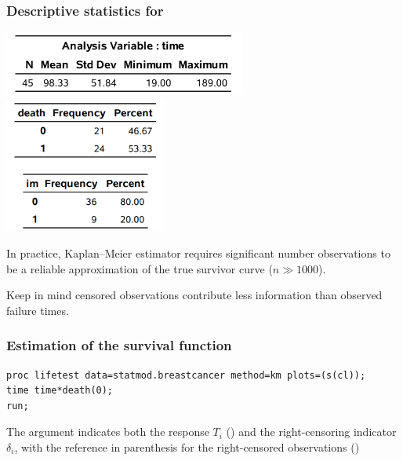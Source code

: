 \documentclass{beamer}
\begin{document}
\begin{frame}
\frametitle{Descriptive statistics for }
\begin{center}
\includegraphics[width = 0.6\textwidth]{img/c7/slides7e01}
\includegraphics[width = 0.4\textwidth]{img/c7/slides7e02}
\end{center}
{
\footnotesize In practice, Kaplan--Meier estimator requires significant number observations to be a reliable approximation of the true survivor curve ($n \gg 1000$).

Keep in mind censored observations contribute less information than observed failure times.

}
\end{frame}


\begin{frame}[fragile]
\frametitle{Estimation of the survival function }

\begin{tcolorbox}[colback=white,colframe=hecblue,title= \SASlang{} code to fit the Kaplan--Meier estimator]
{\footnotesize 
\begin{verbatim}
proc lifetest data=statmod.breastcancer method=km plots=(s(cl));
time time*death(0);
run;
\end{verbatim}
}
\end{tcolorbox}
{ \footnotesize 
The  argument indicates both the response $T_i$ () and the right-censoring indicator $\delta_i$, with the reference in parenthesis for the right-censored observations ()

}
\end{frame}
\end{document}
